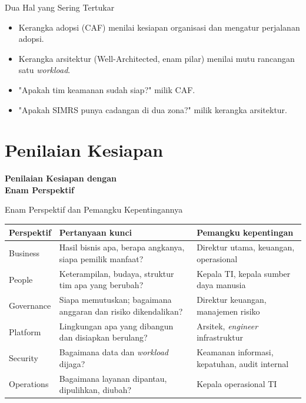 \documentclass[aspectratio=169, table, 12pt]{beamer}
\begin{document}
\begin{frame}{Dua Hal yang Sering Tertukar}
  \begin{itemize}
    \item Kerangka adopsi (CAF) menilai kesiapan organisasi dan mengatur perjalanan
          adopsi.
    \item Kerangka arsitektur (Well-Architected, enam pilar) menilai mutu rancangan satu
          \textit{workload}.
    \item "Apakah tim keamanan sudah siap?" milik CAF.
    \item "Apakah SIMRS punya cadangan di dua zona?" milik kerangka arsitektur.
  \end{itemize}
\end{frame}

\section{Penilaian Kesiapan}

\begin{frame}{\hfill}
  \centering
  \Huge{\textbf{Penilaian Kesiapan dengan\\Enam Perspektif}}
\end{frame}

\begin{frame}{Enam Perspektif dan Pemangku Kepentingannya}
  \scriptsize
  \begin{tabularx}{\textwidth}{>{\raggedright\arraybackslash}p{2cm}Y
      >{\raggedright\arraybackslash}p{4.4cm}}
    \hline
    \textbf{Perspektif} & \textbf{Pertanyaan kunci} & \textbf{Pemangku kepentingan} \\
    \hline
    Business & Hasil bisnis apa, berapa angkanya, siapa pemilik manfaat? & Direktur
      utama, keuangan, operasional \\
    \hline
    People & Keterampilan, budaya, struktur tim apa yang berubah? & Kepala TI, kepala
      sumber daya manusia \\
    \hline
    Governance & Siapa memutuskan; bagaimana anggaran dan risiko dikendalikan? & Direktur
      keuangan, manajemen risiko \\
    \hline
    Platform & Lingkungan apa yang dibangun dan disiapkan berulang? & Arsitek,
      \textit{engineer} infrastruktur \\
    \hline
    Security & Bagaimana data dan \textit{workload} dijaga? & Keamanan informasi,
      kepatuhan, audit internal \\
    \hline
    Operations & Bagaimana layanan dipantau, dipulihkan, diubah? & Kepala operasional TI
      \\
    \hline
  \end{tabularx}
\end{frame}
\end{document}
